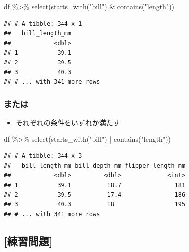 \documentclass[
  xelatex,ja=standard, b5paper]{bxjsbook}
\newenvironment{Shaded}{\begin{snugshade}}{\end{snugshade}}
\newcommand{\FunctionTok}[1]{\textcolor[rgb]{0.00,0.00,0.00}{#1}}
\newcommand{\NormalTok}[1]{#1}
\newcommand{\SpecialCharTok}[1]{\textcolor[rgb]{0.00,0.00,0.00}{#1}}
\newcommand{\StringTok}[1]{\textcolor[rgb]{0.31,0.60,0.02}{#1}}
\providecommand{\tightlist}{%
  \setlength{\itemsep}{0pt}\setlength{\parskip}{0pt}}
\begin{document}
\begin{Shaded}
\begin{Highlighting}[]
\NormalTok{df }\SpecialCharTok{\%\textgreater{}\%}
  \FunctionTok{select}\NormalTok{(}\FunctionTok{starts\_with}\NormalTok{(}\StringTok{"bill"}\NormalTok{) }\SpecialCharTok{\&} \FunctionTok{contains}\NormalTok{(}\StringTok{"length"}\NormalTok{))}
\end{Highlighting}
\end{Shaded}

\begin{verbatim}
## # A tibble: 344 x 1
##   bill_length_mm
##            <dbl>
## 1           39.1
## 2           39.5
## 3           40.3
## # ... with 341 more rows
\end{verbatim}

\hypertarget{select-helper5-2}{%
\subsubsection{または}\label{select-helper5-2}}

\begin{itemize}
\tightlist
\item
  それぞれの条件をいずれか満たす
\end{itemize}

\begin{Shaded}
\begin{Highlighting}[]
\NormalTok{df }\SpecialCharTok{\%\textgreater{}\%}
  \FunctionTok{select}\NormalTok{(}\FunctionTok{starts\_with}\NormalTok{(}\StringTok{"bill"}\NormalTok{) }\SpecialCharTok{|} \FunctionTok{contains}\NormalTok{(}\StringTok{"length"}\NormalTok{))}
\end{Highlighting}
\end{Shaded}

\begin{verbatim}
## # A tibble: 344 x 3
##   bill_length_mm bill_depth_mm flipper_length_mm
##            <dbl>         <dbl>             <int>
## 1           39.1          18.7               181
## 2           39.5          17.4               186
## 3           40.3          18                 195
## # ... with 341 more rows
\end{verbatim}

\hypertarget{ux7df4ux7fd2ux554fux984c-1}{%
\subsection{{[}練習問題{]}}\label{ux7df4ux7fd2ux554fux984c-1}}
\end{document}
